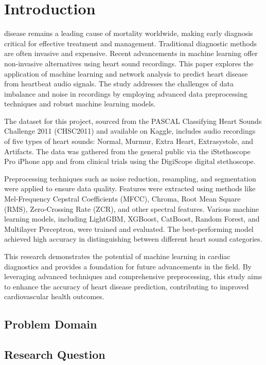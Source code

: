 \section{Introduction}
 disease remains a leading cause of mortality worldwide, making early diagnosis critical for effective treatment and management. Traditional diagnostic methods are often invasive and expensive. Recent advancements in machine learning offer non-invasive alternatives using heart sound recordings. This paper explores the application of machine learning and network analysis to predict heart disease from heartbeat audio signals. The study addresses the challenges of data imbalance and noise in recordings by employing advanced data preprocessing techniques and robust machine learning models.

The dataset for this project, sourced from the PASCAL Classifying Heart Sounds Challenge 2011 (CHSC2011) and available on Kaggle, includes audio recordings of five types of heart sounds: Normal, Murmur, Extra Heart, Extrasystole, and Artifacts. The data was gathered from the general public via the iStethoscope Pro iPhone app and from clinical trials using the DigiScope digital stethoscope.

Preprocessing techniques such as noise reduction, resampling, and segmentation were applied to ensure data quality. Features were extracted using methods like Mel-Frequency Cepstral Coefficients (MFCC), Chroma, Root Mean Square (RMS), Zero-Crossing Rate (ZCR), and other spectral features. Various machine learning models, including LightGBM, XGBoost, CatBoost, Random Forest, and Multilayer Perceptron, were trained and evaluated. The best-performing model achieved high accuracy in distinguishing between different heart sound categories.

This research demonstrates the potential of machine learning in cardiac diagnostics and provides a foundation for future advancements in the field. By leveraging advanced techniques and comprehensive preprocessing, this study aims to enhance the accuracy of heart disease prediction, contributing to improved cardiovascular health outcomes.

\subsection{Problem Domain}

\subsection{Research Question}

